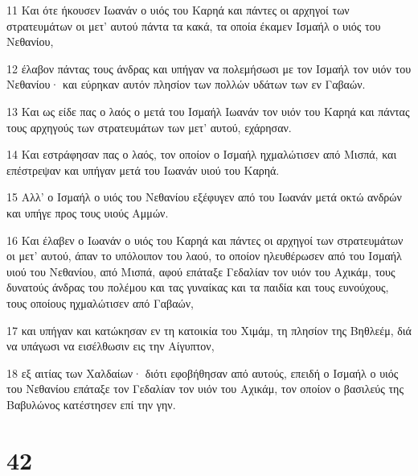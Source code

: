 \par 11 Και ότε ήκουσεν Ιωανάν ο υιός του Καρηά και πάντες οι αρχηγοί των στρατευμάτων οι μετ' αυτού πάντα τα κακά, τα οποία έκαμεν Ισμαήλ ο υιός του Νεθανίου,
\par 12 έλαβον πάντας τους άνδρας και υπήγαν να πολεμήσωσι με τον Ισμαήλ τον υιόν του Νεθανίου· και εύρηκαν αυτόν πλησίον των πολλών υδάτων των εν Γαβαών.
\par 13 Και ως είδε πας ο λαός ο μετά του Ισμαήλ Ιωανάν τον υιόν του Καρηά και πάντας τους αρχηγούς των στρατευμάτων των μετ' αυτού, εχάρησαν.
\par 14 Και εστράφησαν πας ο λαός, τον οποίον ο Ισμαήλ ηχμαλώτισεν από Μισπά, και επέστρεψαν και υπήγαν μετά του Ιωανάν υιού του Καρηά.
\par 15 Αλλ' ο Ισμαήλ ο υιός του Νεθανίου εξέφυγεν από του Ιωανάν μετά οκτώ ανδρών και υπήγε προς τους υιούς Αμμών.
\par 16 Και έλαβεν ο Ιωανάν ο υιός του Καρηά και πάντες οι αρχηγοί των στρατευμάτων οι μετ' αυτού, άπαν το υπόλοιπον του λαού, το οποίον ηλευθέρωσεν από του Ισμαήλ υιού του Νεθανίου, από Μισπά, αφού επάταξε Γεδαλίαν τον υιόν του Αχικάμ, τους δυνατούς άνδρας του πολέμου και τας γυναίκας και τα παιδία και τους ευνούχους, τους οποίους ηχμαλώτισεν από Γαβαών,
\par 17 και υπήγαν και κατώκησαν εν τη κατοικία του Χιμάμ, τη πλησίον της Βηθλεέμ, διά να υπάγωσι να εισέλθωσιν εις την Αίγυπτον,
\par 18 εξ αιτίας των Χαλδαίων· διότι εφοβήθησαν από αυτούς, επειδή ο Ισμαήλ ο υιός του Νεθανίου επάταξε τον Γεδαλίαν τον υιόν του Αχικάμ, τον οποίον ο βασιλεύς της Βαβυλώνος κατέστησεν επί την γην.

\chapter{42}

